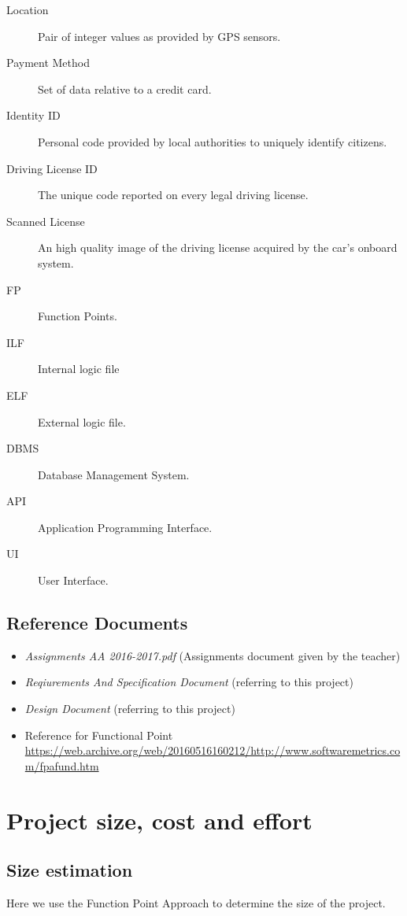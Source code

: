 \documentclass[11pt]{article} %
\begin{document}
\begin{description}
	\item[Location] Pair of integer values as provided by GPS sensors.
	\item[Payment Method] Set of data relative to a credit card.
	\item[Identity ID] Personal code provided by local authorities to uniquely identify citizens.
	\item[Driving License ID] The unique code reported on every legal driving license.
	\item[Scanned License] An high quality image of the driving license acquired by the car's onboard system.
	\item[FP] Function Points.
	\item[ILF] Internal logic file
	\item[ELF] External logic file.
	\item[DBMS] Database Management System.
	\item[API] Application Programming Interface.
	\item[UI] User Interface.
  \end{description}

\subsection{Reference Documents}
\begin{itemize}
	\item \textit{Assignments AA 2016-2017.pdf} (Assignments document given by the teacher)
	\item \textit{Reqiurements And Specification Document} (referring to this project)
	\item \textit{Design Document} (referring to this project)
	\item	Reference for Functional Point \url{https://web.archive.org/web/20160516160212/http://www.softwaremetrics.com/fpafund.htm}
  \end{itemize}

\section{Project size, cost and effort}

\subsection{Size estimation}

Here we use the Function Point Approach to determine the size of the project.
\end{document}

